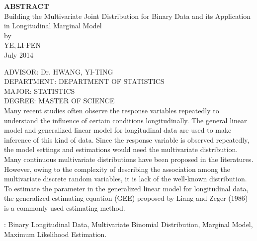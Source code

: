 \begin{center}{\Large \bf ABSTRACT}\\[20pt]
    {\large Building the Multivariate Joint Distribution for Binary Data and its Application in Longitudinal Marginal Model}\\[10pt]
        by\\[10pt]  YE,\,LI-FEN\\[10pt] July 2014
\end{center}
{\small ADVISOR: Dr. HWANG, YI-TING \\[5pt]
        DEPARTMENT: DEPARTMENT OF STATISTICS\\[5pt]
        MAJOR: STATISTICS\\[5pt]
        DEGREE: MASTER OF SCIENCE}\\[10pt]
\noindent
Many recent studies often observe the response variables repeatedly to understand the influence of certain conditions longitudinally.
The general linear model and generalized linear model for longitudinal data are used to make inference of this kind of data.
Since the response variable is observed repeatedly, the model settings and estimations would need the multivariate distribution.
Many continuous multivariate distributions have been proposed in the literatures.
However, owing to the complexity of describing the association among the multivariate discrete random variables, it is lack of the well-known distribution.
To estimate the parameter in the generalized linear model for longitudinal data, the generalized estimating equation (GEE) proposed by Liang and Zeger (1986) is a commonly used estimating method.

\vspace*{2cm}
: Binary Longitudinal Data, Multivariate Binomial Distribution, Marginal Model, Maximum Likelihood Estimation.
%


